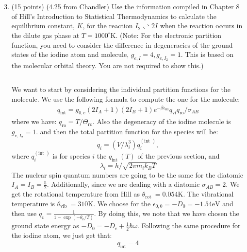 \documentclass[12pt]{article}
\begin{document}
\section{}
\begin{enumerate}
  \setcounter{enumi}{2}
  \item (15 points) (4.25 from Chandler) Use the information compiled in Chapter 8 of Hill's Introduction to Statistical Thermodynamics to calculate the equilibrium constant, $K$, for the reaction $I_{2} \rightleftharpoons 2 I$ when the reaction occurs in the dilute gas phase at $T=1000^{\circ} \mathrm{K}$. (Note: For the electronic partition function, you need to consider the difference in degeneracies of the ground states of the iodine atom and molecule, $g_{e, I}=4, g_{e, I_{2}}=1$. This is based on the molecular orbital theory. You are not required to show this.)
\subsection{}
We want to start by considering the individual partition functions for the molecule. We use the following formula to compute the one for the molecule:
\begin{equation}
\begin{aligned}
q_{\mathrm{int}}=g_{0, e}\left(2 I_A+1\right)\left(2 I_B+1\right) e^{-\beta \epsilon_{00}} q_{\mathrm{vi}} q_{\mathrm{ro}} / \sigma_{A B}
\end{aligned}
\end{equation}
where we have:
$q_{\mathrm{ro}}=T / \Theta_{\mathrm{ro}}$. Also the degeneracy of the iodine molecule is $g_{e, I_{2}}=1$. 
and then the total partition function for the species will be:
$$
q_i=\left(V / \lambda_i^3\right) q_i^{(\text {int })},
$$
where $q_i^{(\text {int })}$ is for species $i$ the $q_{\text {int }}(T)$ of the previous section, and
$$
\lambda_i=h / \sqrt{2 \pi m_i k_B T}
$$
The nuclear spin quantum numbers are going to be the same for the diatomic $I_A=I_B=\frac{5}{2}$. Additionally, since we are dealing with a diatomic $\sigma _{A B}=2$. We get the rotational temperature from Hill as $\theta_{\text {rot }}=0.054 \mathrm{K}$. The vibrational temperature is $\theta_{\text {vib }}=310 \mathrm{K}$. We choose for the $\epsilon_{0,0}=-D_0=-1.54 \text{eV}$ and then use $q_v=\frac{1}{1-\exp \left(-\theta_v / T\right)}$. By doing this, we note that we have chosen the ground state energy as $-D_0=-D_e+\frac{1}{2}\hbar\omega $. Following the same procedure for the iodine atom, we just get that:
\begin{equation}
  q_{\text{int}}= 4
\end{equation}

\end{enumerate}
\end{document}
